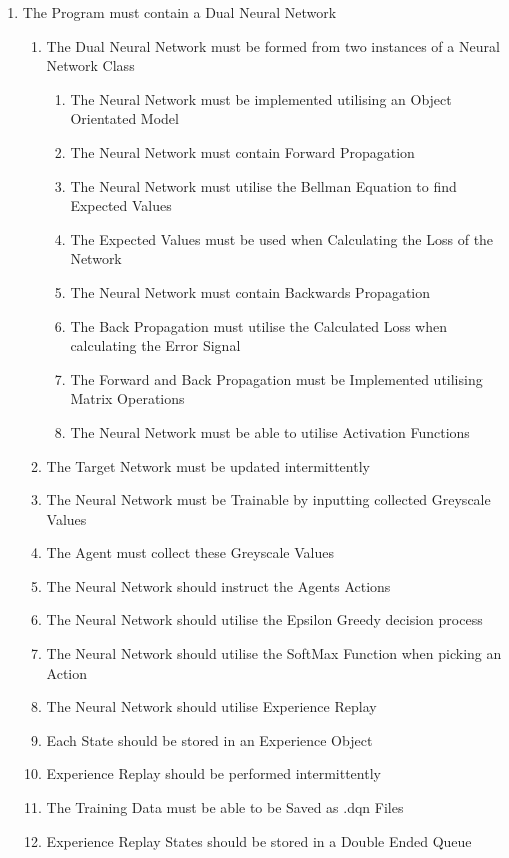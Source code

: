 \begin{flushleft}
\begin{enumerate}
                \item The Program must contain a Dual Neural Network
                \begin{enumerate}
                    \item The Dual Neural Network must be formed from two instances of a Neural Network Class
                    \begin{enumerate}
                        \item The Neural Network must be implemented utilising an Object Orientated Model
                        \item The Neural Network must contain Forward Propagation
                        \item The Neural Network must utilise the Bellman Equation to find Expected Values
                        \item The Expected Values must be used when Calculating the Loss of the Network
                        \item The Neural Network must contain Backwards Propagation
                        \item The Back Propagation must utilise the Calculated Loss when calculating the Error Signal
                        \item The Forward and Back Propagation must be Implemented utilising Matrix Operations
                        \item The Neural Network must be able to utilise Activation Functions
                    \end{enumerate}
                    \item The Target Network must be updated intermittently
                    \item The Neural Network must be Trainable by inputting collected Greyscale Values
                    \item The Agent must collect these Greyscale Values
                    \item The Neural Network should instruct the Agents Actions
                    \item The Neural Network should utilise the Epsilon Greedy decision process
                    \item The Neural Network should utilise the SoftMax Function when picking an Action
                    \item The Neural Network should utilise Experience Replay
                    \item Each State should be stored in an Experience Object
                    \item Experience Replay should be performed intermittently
                    \item The Training Data must be able to be Saved as .dqn Files
                    \item Experience Replay States should be stored in a Double Ended Queue
                \end{enumerate}


\end{enumerate}
\end{flushleft}
